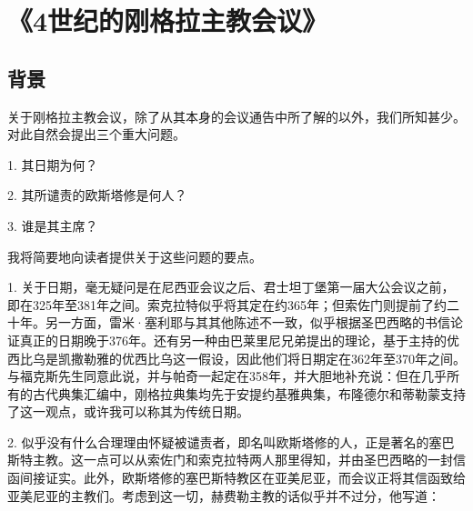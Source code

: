 
\chapter{《4世纪的刚格拉主教会议》}



\section{背景}

关于刚格拉主教会议，除了从其本身的会议通告中所了解的以外，我们所知甚少。对此自然会提出三个重大问题。\par

1. 其日期为何？\par

2. 其所谴责的欧斯塔修是何人？\par

3. 谁是其主席？\par

我将简要地向读者提供关于这些问题的要点。\par

1. 关于日期，毫无疑问是在尼西亚会议之后、君士坦丁堡第一届大公会议之前，即在325年至381年之间。索克拉特似乎将其定在约365年；但索佐门则提前了约二十年。另一方面，雷米·塞利耶与其其他陈述不一致，似乎根据圣巴西略的书信论证真正的日期晚于376年。还有另一种由巴莱里尼兄弟提出的理论，基于主持的优西比乌是凯撒勒雅的优西比乌这一假设，因此他们将日期定在362年至370年之间。与福克斯先生同意此说，并与帕奇一起定在358年，并大胆地补充说：但在几乎所有的古代典集汇编中，刚格拉典集均先于安提约基雅典集，布隆德尔和蒂勒蒙支持了这一观点，或许我可以称其为传统日期。\par

2. 似乎没有什么合理理由怀疑被谴责者，即名叫欧斯塔修的人，正是著名的塞巴斯特主教。这一点可以从索佐门和索克拉特两人那里得知，并由圣巴西略的一封信函间接证实。此外，欧斯塔修的塞巴斯特教区在亚美尼亚，而会议正将其信函致给亚美尼亚的主教们。考虑到这一切，赫费勒主教的话似乎并不过分，他写道：\par

